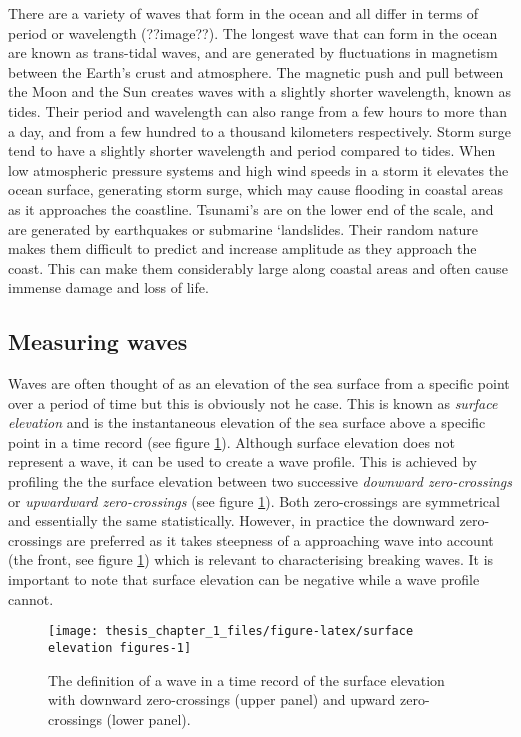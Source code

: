 \documentclass[
]{article}
\begin{document}
There are a variety of waves that form in the ocean and all differ in
terms of period or wavelength (??image??). The longest wave that can
form in the ocean are known as trans-tidal waves, and are generated by
fluctuations in magnetism between the Earth's crust and atmosphere. The
magnetic push and pull between the Moon and the Sun creates waves with a
slightly shorter wavelength, known as tides. Their period and wavelength
can also range from a few hours to more than a day, and from a few
hundred to a thousand kilometers respectively. Storm surge tend to have
a slightly shorter wavelength and period compared to tides. When low
atmospheric pressure systems and high wind speeds in a storm it elevates
the ocean surface, generating storm surge, which may cause flooding in
coastal areas as it approaches the coastline. Tsunami's are on the lower
end of the scale, and are generated by earthquakes or submarine
`landslides. Their random nature makes them difficult to predict and
increase amplitude as they approach the coast. This can make them
considerably large along coastal areas and often cause immense damage
and loss of life.

\hypertarget{measuring-waves}{%
\subsection{Measuring waves}\label{measuring-waves}}

Waves are often thought of as an elevation of the sea surface from a
specific point over a period of time but this is obviously not he case.
This is known as \emph{surface elevation} and is the instantaneous
elevation of the sea surface above a specific point in a time record
(see figure \ref{fig:surface elevation figures}). Although surface
elevation does not represent a wave, it can be used to create a wave
profile. This is achieved by profiling the the surface elevation between
two successive \emph{downward zero-crossings} or \emph{upwardward
zero-crossings} (see figure \ref{fig:surface elevation figures}). Both
zero-crossings are symmetrical and essentially the same statistically.
However, in practice the downward zero-crossings are preferred as it
takes steepness of a approaching wave into account (the front, see
figure \ref{fig:surface elevation figures}) which is relevant to
characterising breaking waves. It is important to note that surface
elevation can be negative while a wave profile cannot.

\begin{figure}

{\centering \texttt{[image: thesis\_chapter\_1\_files/figure-latex/surface elevation figures-1]} 

}

\caption{\label{fig:surface elevation figures}The definition of a wave in a time record of the surface elevation with downward zero-crossings (upper panel) and upward zero-crossings (lower panel).}\label{fig:surface elevation figures}
\end{figure}
\end{document}
